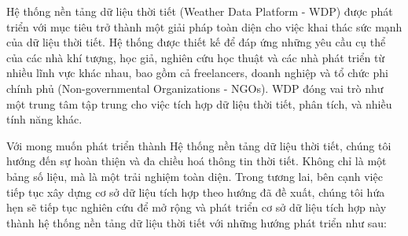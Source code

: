 Hệ thống nền tảng dữ liệu thời tiết (Weather Data Platform - WDP) được phát triển với mục tiêu trở thành một giải pháp toàn diện cho việc khai thác sức mạnh của dữ liệu thời tiết. Hệ thống được thiết kế để đáp ứng những yêu cầu cụ thể của các nhà khí tượng, học giả, nghiên cứu học thuật và các nhà phát triển từ nhiều lĩnh vực khác nhau, bao gồm cả freelancers, doanh nghiệp và tổ chức phi chính phủ (Non-governmental Organizations - NGOs). WDP đóng vai trò như một trung tâm tập trung cho việc tích hợp dữ liệu thời tiết, phân tích, và nhiều tính năng khác.

Với mong muốn phát triển thành Hệ thống nền tảng dữ liệu thời tiết, chúng tôi hướng đến sự hoàn thiện và đa chiều hoá thông tin thời tiết. Không chỉ là một bảng số liệu, mà là một trải nghiệm toàn diện. Trong tương lai, bên cạnh việc tiếp tục xây dựng cơ sở dữ liệu tích hợp theo hướng đã đề xuất, chúng tôi hứa hẹn sẽ tiếp tục nghiên cứu để mở rộng và phát triển cơ sở dữ liệu tích hợp này thành hệ thống nền tảng dữ liệu thời tiết với những hướng phát triển như sau:

